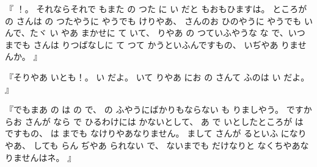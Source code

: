 『
！。
それならそれで
もまた
の
つた
に
い
だと
もおもひますは。
ところが
の
さんは
の
つたやうに
やうでも
けりやあ、
さんのお
ひのやうに
やうでも
いんで、たヾ
い
やあ
まかせに
て
いて、
りやあ
の
つていふやうな
な
で、いつまでも
さんは
りつばなしに
て
つて
かうといふんですもの、
いぢやあ
りませんか。
』

『そりやあ
いとも！。
い
だよ。
いて
りやあ
にお
の
さんて
ふのは
い
だよ。
』

『でもまあ
の
は
の
で、
の
ふやうにばかりもならない
も
りましやう。
ですからお
さんが
なら
で
ひるわけには
かないとして、
あ
で
いとしたところが
は
ですもの、
は
までも
なけりやあなりません。
まして
さんが
るといふ
になりやあ、
しても
らん
ぢやあ
られない
で、
ないまでも
だけなりと
なくちやあなりませんはネ。
』

